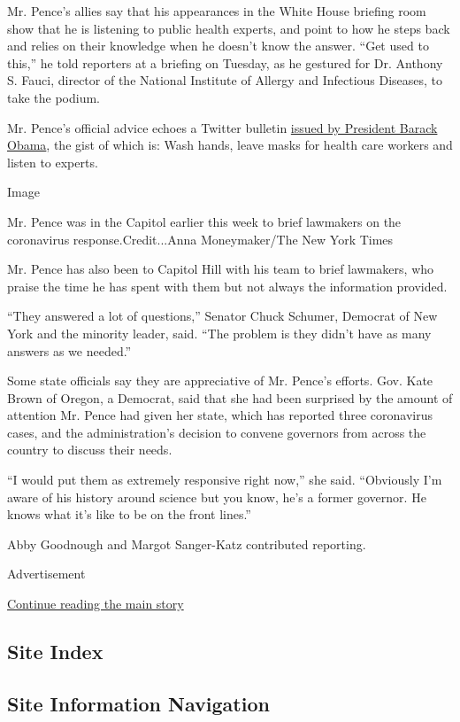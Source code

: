 Mr. Pence's allies say that his appearances in the White House briefing
room show that he is listening to public health experts, and point to
how he steps back and relies on their knowledge when he doesn't know the
answer. ``Get used to this,'' he told reporters at a briefing on
Tuesday, as he gestured for Dr. Anthony S. Fauci, director of the
National Institute of Allergy and Infectious Diseases, to take the
podium.

Mr. Pence's official advice echoes a Twitter bulletin
\href{https://twitter.com/BarackObama/status/1235246706817630208}{issued
by President Barack Obama}, the gist of which is: Wash hands, leave
masks for health care workers and listen to experts.

Image

Mr. Pence was in the Capitol earlier this week to brief lawmakers on the
coronavirus response.Credit...Anna Moneymaker/The New York Times

Mr. Pence has also been to Capitol Hill with his team to brief
lawmakers, who praise the time he has spent with them but not always the
information provided.

``They answered a lot of questions,'' Senator Chuck Schumer, Democrat of
New York and the minority leader, said. ``The problem is they didn't
have as many answers as we needed.''

Some state officials say they are appreciative of Mr. Pence's efforts.
Gov. Kate Brown of Oregon, a Democrat, said that she had been surprised
by the amount of attention Mr. Pence had given her state, which has
reported three coronavirus cases, and the administration's decision to
convene governors from across the country to discuss their needs.

``I would put them as extremely responsive right now,'' she said.
``Obviously I'm aware of his history around science but you know, he's a
former governor. He knows what it's like to be on the front lines.''

Abby Goodnough and Margot Sanger-Katz contributed reporting.

Advertisement

\protect\hyperlink{after-bottom}{Continue reading the main story}

\hypertarget{site-index}{%
\subsection{Site Index}\label{site-index}}

\hypertarget{site-information-navigation}{%
\subsection{Site Information
Navigation}\label{site-information-navigation}}


